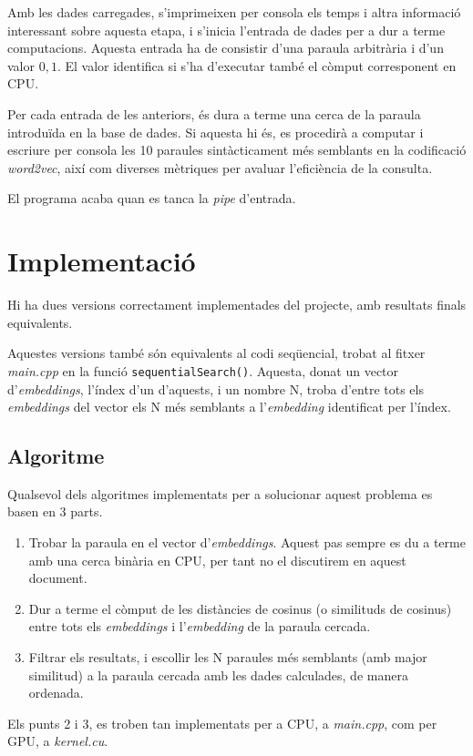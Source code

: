 \documentclass[catalan,10pt,a4paper]{article}
\begin{document}
Amb les dades carregades, s'imprimeixen per consola els temps i altra informació interessant sobre aquesta etapa, i s'inicia l'entrada de dades per a dur a terme computacions. Aquesta entrada ha de consistir d'una paraula arbitrària i d'un valor ${0,1}$. El valor identifica si s'ha d'executar també el còmput corresponent en CPU.

Per cada entrada de les anteriors, és dura a terme una cerca de la paraula introduïda en la base de dades. Si aquesta hi és, es procedirà a computar i escriure per consola les 10 paraules sintàcticament més semblants en la codificació \textit{word2vec}, així com diverses mètriques per avaluar l'eficiència de la consulta.

El programa acaba quan es tanca la \textit{pipe} d'entrada.


\section*{Implementació}
Hi ha dues versions correctament implementades del projecte, amb resultats finals equivalents.

Aquestes versions també són equivalents al codi seqüencial, trobat al fitxer \textit{main.cpp} en la funció \verb|sequentialSearch()|. Aquesta, donat un vector d'\textit{embeddings}, l'índex d'un d'aquests, i un nombre N, troba d'entre tots els \textit{embeddings} del vector els N més semblants a l'\textit{embedding} identificat per l'índex.

\subsection*{Algoritme}
Qualsevol dels algoritmes implementats per a solucionar aquest problema es basen en 3 parts.
\begin{enumerate}
	\item Trobar la paraula en el vector d'\textit{embeddings}. Aquest pas sempre es du a terme amb una cerca binària en CPU, per tant no el discutirem en aquest document.
	\item Dur a terme el còmput de les distàncies de cosinus (o similituds de cosinus) entre tots els \textit{embeddings} i l'\textit{embedding} de la paraula cercada.
	\item Filtrar els resultats, i escollir les N paraules més semblants (amb major similitud) a la paraula cercada amb les dades calculades, de manera ordenada.
\end{enumerate}

Els punts 2 i 3, es troben tan implementats per a CPU, a \textit{main.cpp}, com per GPU, a \textit{kernel.cu}.
\end{document}
